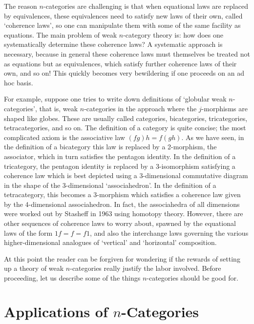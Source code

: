 The reason $n$-categories are challenging is that when equational laws
are replaced by equivalences, these equivalences need to satisfy new
laws of their own, called `coherence laws', so one can manipulate them
with some of the same facility as equations.  The main problem of weak
$n$-category theory is: how does one systematically determine these
coherence laws?  A systematic approach is necessary, because in general
these coherence laws must themselves be treated not as equations but as
equivalences, which satisfy further coherence laws of their own, and so
on!  This quickly becomes very bewildering if one proceeds on an ad hoc
basis.

For example, suppose one tries to write down definitions of `globular
weak $n$-categories', that is, weak $n$-categories in the approach where
the $j$-morphisms are shaped like globes.  These are usually called
categories, bicategories, tricategories, tetracategories, and so on.
The definition of a category is quite concise; the most complicated
axiom is the associative law $(fg)h = f(gh)$.  As we
have seen, in the definition of a bicategory this law is replaced by a
2-morphism, the associator, which in turn satisfies the pentagon
identity.  In the definition of a tricategory, the pentagon identity is
replaced by a 3-isomorphism satisfying a coherence law which is best
depicted using a 3-dimensional commutative diagram in the shape of the
3-dimensional `associahedron'.  In the definition of a tetracategory,
this becomes a 3-morphism which satisfies a coherence law given by the
4-dimensional associahedron.  In fact, the associahedra of all
dimensions were worked out by Stasheff \cite{Stasheff} in 1963 using
homotopy theory.  However, there are other sequences of coherence laws
to worry about, spawned by the equational laws of the form $1f = f =
f1$, and also the interchange laws governing the various
higher-dimensional analogues of `vertical' and `horizontal' composition.

At this point the reader can be forgiven for wondering if the rewards of
setting up a theory of weak $n$-categories really justify the labor
involved.  Before proceeding, let us describe some of the things
$n$-categories should be good for.

\section{Applications of $n$-Categories}

